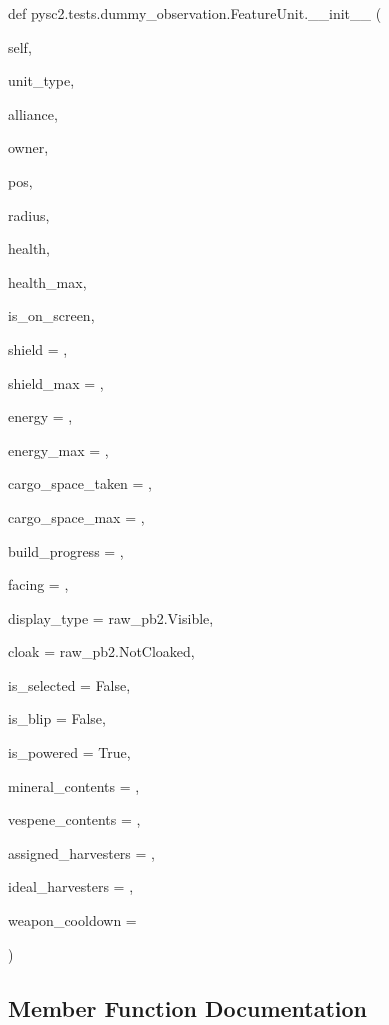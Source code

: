 {\footnotesize\ttfamily def pysc2.\+tests.\+dummy\+\_\+observation.\+Feature\+Unit.\+\_\+\+\_\+init\+\_\+\+\_\+ (\begin{DoxyParamCaption}\item[{}]{self,  }\item[{}]{unit\+\_\+type,  }\item[{}]{alliance,  }\item[{}]{owner,  }\item[{}]{pos,  }\item[{}]{radius,  }\item[{}]{health,  }\item[{}]{health\+\_\+max,  }\item[{}]{is\+\_\+on\+\_\+screen,  }\item[{}]{shield = {},  }\item[{}]{shield\+\_\+max = {},  }\item[{}]{energy = {},  }\item[{}]{energy\+\_\+max = {},  }\item[{}]{cargo\+\_\+space\+\_\+taken = {},  }\item[{}]{cargo\+\_\+space\+\_\+max = {},  }\item[{}]{build\+\_\+progress = {},  }\item[{}]{facing = {},  }\item[{}]{display\+\_\+type = {\ttfamily raw\+\_\+pb2.Visible},  }\item[{}]{cloak = {\ttfamily raw\+\_\+pb2.NotCloaked},  }\item[{}]{is\+\_\+selected = {\ttfamily False},  }\item[{}]{is\+\_\+blip = {\ttfamily False},  }\item[{}]{is\+\_\+powered = {\ttfamily True},  }\item[{}]{mineral\+\_\+contents = {},  }\item[{}]{vespene\+\_\+contents = {},  }\item[{}]{assigned\+\_\+harvesters = {},  }\item[{}]{ideal\+\_\+harvesters = {},  }\item[{}]{weapon\+\_\+cooldown = {} }\end{DoxyParamCaption})}



\subsection{Member Function Documentation}
\mbox{\label{classpysc2_1_1tests_1_1dummy__observation_1_1_feature_unit_a427b9dbadc0902aa5484f00f8a05de60}} 
